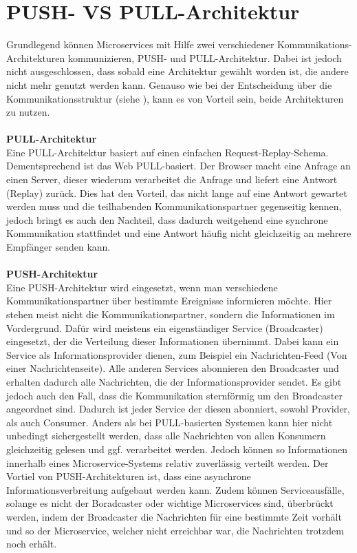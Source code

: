 \section{PUSH- VS PULL-Architektur}
\label{sec:PushPullArchitektur}
Grundlegend können Microservices mit Hilfe zwei verschiedener Kommunikations-Architekturen kommunizieren, PUSH- und PULL-Architektur. Dabei ist jedoch nicht ausgeschlossen, dass sobald eine Architektur gewählt worden ist, die andere nicht mehr genutzt werden kann. Genauso wie bei der Entscheidung über die Kommunikationsstruktur (siehe ), kann es von Vorteil sein, beide Architekturen zu nutzen.
\\\\
\textbf{PULL-Architektur}\\
Eine PULL-Architektur basiert auf einen einfachen Request-Replay-Schema. Dementsprechend ist das Web PULL-basiert.
Der Browser macht eine Anfrage an einen Server, dieser wiederum verarbeitet die Anfrage und liefert eine Antwort (Replay) zurück. Dies hat den Vorteil, das nicht lange auf eine Antwort gewartet werden muss und die teilhabenden Kommunikationspartner gegenseitig kennen, jedoch bringt es auch den Nachteil, dass dadurch weitgehend eine synchrone Kommunikation stattfindet und eine Antwort häufig nicht gleichzeitig an mehrere Empfänger senden kann.
\\\\
\textbf{PUSH-Architektur}\\
Eine PUSH-Architektur wird eingesetzt, wenn man verschiedene Kommunikationspartner über bestimmte Ereignisse informieren möchte. Hier stehen meist nicht die Kommunikationspartner, sondern die Informationen im Vordergrund. Dafür wird meistens ein eigenständiger Service (Broadcaster) eingesetzt, der die Verteilung dieser Informationen übernimmt. Dabei kann ein Service als Informationsprovider dienen, zum Beispiel ein Nachrichten-Feed (Von einer Nachrichtenseite). Alle anderen Services abonnieren den Broadcaster und erhalten dadurch alle Nachrichten, die der Informationsprovider sendet.
Es gibt jedoch auch den Fall, dass die Kommunikation sternförmig um den Broadcaster angeordnet sind. Dadurch ist jeder Service der diesen abonniert, sowohl Provider, als auch Consumer.
Anders als bei PULL-basierten Systemen kann hier nicht unbedingt sichergestellt werden, dass alle Nachrichten von allen Konsumern gleichzeitig gelesen und ggf. verarbeitet werden. Jedoch können so Informationen innerhalb eines Microservice-Systems relativ zuverlässig verteilt werden.
Der Vortiel von PUSH-Architekturen ist, dass eine asynchrone Informationsverbreitung aufgebaut werden kann. Zudem können Serviceausfälle, solange es nicht der Boradcaster oder wichtige Microservices sind, überbrückt werden, indem der Broadcaster die Nachrichten für eine bestimmte Zeit vorhält und so der Microservice, welcher nicht erreichbar war, die Nachrichten trotzdem noch erhält.
